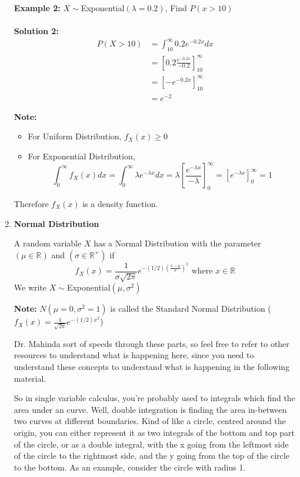 \documentclass[12pt]{article}
\begin{document}
\begin{enumerate}
{	\textbf{Example 2:} $X \sim $Exponential$(\lambda = 0.2)$, Find $P(x > 10)$\\
	\\
	\textbf{Solution 2:}
	\begin{align*}
		P(X > 10) &= \int^{\infty}_{10} 0.2e^{-0.2x} dx\\
		&= [0.2 \frac{e^{-0.2x}}{-0.2}]^{\infty}_{10}\\
		&= [ -e^{-0.2x}]^{\infty}_{10}\\
		&= e^{-2}
	\end{align*}
	
	\textbf{Note:}
	\begin{itemize}
		\item{For Uniform Distribution, $f_X (x) \geq 0$}
		\item{For Exponential Distribution, $$\int^{\infty}_{0} f_X (x) dx = \int^{\infty}_{0} \lambda e^{-\lambda x} dx = \lambda [\frac{e^{-\lambda x}}{-\lambda}]^{\infty}_{0} = [e^{-\lambda x}]^{\infty}_{0} = 1$$}
	\end{itemize}

	Therefore $f_X (x)$ is a density function.
	
	}
	\item{
	\textbf{Normal Distribution}
	
	\begin{tcolorbox}[title=Defintion: Normal Distribution]
		A random variable $X$ has a Normal Distribution with the parameter $(\mu \in\mathbb{R})$ and $(\sigma \in\mathbb{R}^{+})$ if 
		$$f_X (x) = \frac{1}{\sigma \sqrt{2\pi}} e^{-(1/2)(\frac{x - \mu}{\sigma})^2} \text{ where } x\in\mathbb{R}$$
		We write $X \sim $Exponential$(\mu, \sigma^2 )$
	\end{tcolorbox}
	
	\textbf{Note:} $N(\mu = 0, \sigma^2 = 1)$ is called the Standard Normal Distribution ($f_X (x) = \frac{1}{\sqrt{2\pi}} e^{-(1/2)x^2}$)
	
	\begin{tcolorbox}[colback=red!5!white,colframe=red!75!black,title= Multivariable Calculus and Polar Coordinates Crash Course]
	
	Dr. Mahinda sort of speeds through these parts, so feel free to refer to other resources to understand what is happening here, since you need to understand these concepts to understand what is happening in the following material.
	
	\tcblower
	
	So in single variable calculus, you're probably used to integrals which find the area under an curve. Well, double integration is finding the area in-between two curves at different boundaries. Kind of like a circle, centred around the origin, you can either represent it as two integrals of the bottom and top part of the circle, or as a double integral, with the x going from the leftmost side of the circle to the rightmost side, and the y going from the top of the circle to the bottom. As an example, consider the circle with radius 1.
	

\end{tcolorbox}}
\end{enumerate}
\end{document}
